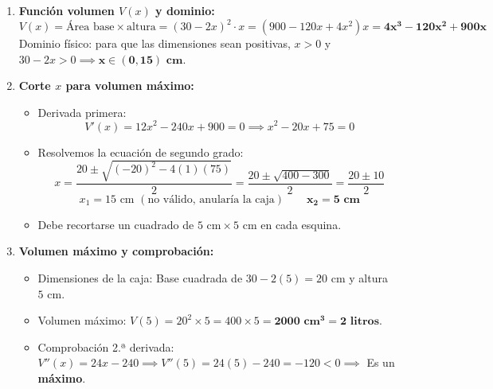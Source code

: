﻿\documentclass[11pt,a4paper]{article}
\begin{document}
\begin{enumerate}[label=\textbf{\alph*)}, leftmargin=2em, itemsep=4pt]
    \item \textbf{Función volumen $V(x)$ y dominio:}
    \[
    V(x) = \text{Área base} \times \text{altura} = (30 - 2x)^2 \cdot x = (900 - 120x + 4x^2)x = \mathbf{4x^3 - 120x^2 + 900x}
    \]
    Dominio físico: para que las dimensiones sean positivas, $x > 0$ y $30 - 2x > 0 \implies \mathbf{x \in (0, 15)\text{ cm}}$.

    \item \textbf{Corte $x$ para volumen máximo:}
    \begin{itemize}[leftmargin=1.5em, itemsep=2pt]
        \item Derivada primera:
        \[
        V'(x) = 12x^2 - 240x + 900 = 0 \implies x^2 - 20x + 75 = 0
        \]
        \item Resolvemos la ecuación de segundo grado:
        \[
        x = \frac{20 \pm \sqrt{(-20)^2 - 4(1)(75)}}{2} = \frac{20 \pm \sqrt{400 - 300}}{2} = \frac{20 \pm 10}{2}
        \]
        \[
        x_1 = 15\text{ cm } (\text{no válido, anularía la caja}) \qquad \mathbf{x_2 = 5\text{ cm}}
        \]
        \item Debe recortarse un cuadrado de \textbf{$5\text{ cm} \times 5\text{ cm}$} en cada esquina.
    \end{itemize}

    \item \textbf{Volumen máximo y comprobación:}
    \begin{itemize}[leftmargin=1.5em, itemsep=2pt]
        \item Dimensiones de la caja: Base cuadrada de $30 - 2(5) = 20\text{ cm}$ y altura $5\text{ cm}$.
        \item Volumen máximo: $V(5) = 20^2 \times 5 = 400 \times 5 = \mathbf{2000\text{ cm}^3} = \mathbf{2\text{ litros}}$.
        \item Comprobación 2.ª derivada: $V''(x) = 24x - 240 \implies V''(5) = 24(5) - 240 = -120 < 0 \implies$ Es un \textbf{máximo}.
    \end{itemize}
\end{enumerate}
\end{document}
